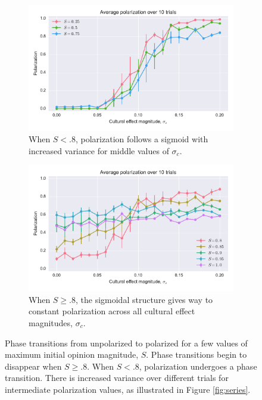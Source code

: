\documentclass[11pt,letterpaper]{article}
\newcommand{\sigc}{\ensuremath{\sigma_c}}
\begin{document}
\begin{figure}
  \centering
  \begin{subfigure}[b]{\textwidth}
    \centering
    \includegraphics[width=.9\textwidth]{figures/pol-by-culture-25-5-75.pdf}
    \caption{When $S < .8$, polarization follows a sigmoid with increased
    variance for middle values of $\sigc$.}
  \end{subfigure}

  \begin{subfigure}[b]{\textwidth}
    \centering
    \includegraphics[width=.9\textwidth]{figures/pol-by-culture-8-85-9-95-100.pdf}
    \caption{When $S \geq .8$, the sigmoidal structure gives way to constant
    polarization across all cultural effect magnitudes, $\sigc$.}
  \end{subfigure}

  \caption{Phase transitions from unpolarized to polarized for a few values
    of maximum initial opinion magnitude, $S$. Phase transitions begin to 
    disappear when $S \geq .8$. When $S < .8$, polarization undergoes a 
    phase transition. There is increased variance over different trials 
    for intermediate polarization values, as illustrated in Figure \ref{fig:series}.
    }
  \label{fig:phase-transitions-by-culture}
\end{figure}
\end{document}
